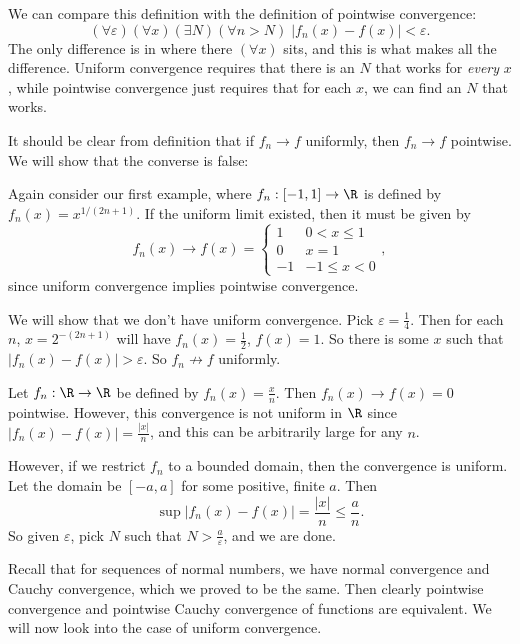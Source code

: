 \documentclass[a4paper]{article}
\begin{document}
We can compare this definition with the definition of pointwise convergence:
\[
  (\forall \varepsilon)(\forall x)(\exists N)(\forall n > N)\; |f_n(x) - f(x)| < \varepsilon.
\]
The only difference is in where there $(\forall x)$ sits, and this is what makes all the difference. Uniform convergence requires that there is an $N$ that works for \emph{every} $x$, while pointwise convergence just requires that for each $x$, we can find an $N$ that works.

It should be clear from definition that if $f_n \to f$ uniformly, then $f_n \to f$ pointwise. We will show that the converse is false:
\begin{eg}
  Again consider our first example, where $f_n: [-1, 1] \to \R$ is defined by $f_n(x) = x^{1/(2n + 1)}$. If the uniform limit existed, then it must be given by
  \[
    f_n(x) \to f(x) =
    \begin{cases}
      1 & 0 < x \leq 1\\
      0 & x = 1\\
      -1 & -1 \leq x < 0
    \end{cases},
  \]
  since uniform convergence implies pointwise convergence.

  We will show that we don't have uniform convergence. Pick $\varepsilon = \frac{1}{4}$. Then for each $n$, $x = 2^{-(2n + 1)}$ will have $f_n(x) = \frac{1}{2}$, $f(x) = 1$. So there is some $x$ such that $|f_n(x) - f(x)| > \varepsilon$. So $f_n \not\to f$ uniformly.
\end{eg}

\begin{eg}
  Let $f_n: \R \to \R$ be defined by $f_n (x) = \frac{x}{n}$. Then $f_n(x) \to f(x) = 0$ pointwise. However, this convergence is not uniform in $\R$ since $|f_n(x) - f(x)| = \frac{|x|}{n}$, and this can be arbitrarily large for any $n$.

  However, if we restrict $f_n$ to a bounded domain, then the convergence is uniform. Let the domain be $[-a, a]$ for some positive, finite $a$. Then
  \[
    \sup |f_n(x) - f(x)| = \frac{|x|}{n} \leq \frac{a}{n}.
  \]
  So given $\varepsilon$, pick $N$ such that $N > \frac{a}{\varepsilon}$, and we are done.
\end{eg}

Recall that for sequences of normal numbers, we have normal convergence and Cauchy convergence, which we proved to be the same. Then clearly pointwise convergence and pointwise Cauchy convergence of functions are equivalent. We will now look into the case of uniform convergence.
\end{document}
